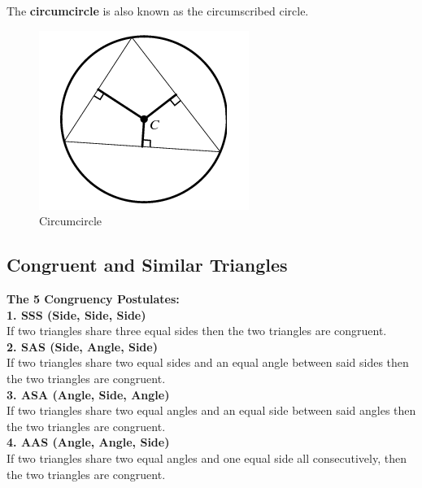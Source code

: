 \documentclass{article}
\begin{document}
            \noindent The \textbf{circumcircle} is also known as the circumscribed circle. \\
            \begin{figure} [hbt!]
                \centering
                \includegraphics[scale = 0.75] {Resources/Unit2Triangles/circumcircle.PNG}
                \caption*{Circumcircle}
            \end{figure}

        \subsection{Congruent and Similar Triangles}
            \color{purple} \textbf{The 5 Congruency Postulates:} \color{black} \\

            \noindent \color{purple}\textbf{1. SSS (Side, Side, Side)} \color{black}\\
            \noindent If two triangles share three equal sides then the two triangles are congruent. \\

            \noindent \color{purple}\textbf{2. SAS (Side, Angle, Side)}\color{black} \\
            \noindent If two triangles share two equal sides and an equal angle between said sides
            then the two triangles are congruent. \\

            \noindent \color{purple}\textbf{3. ASA (Angle, Side, Angle)}\color{black} \\
            \noindent If two triangles share two equal angles and an equal side between said angles
            then the two triangles are congruent. \\

            \noindent \color{purple}\textbf{4. AAS (Angle, Angle, Side)}\color{black} \\
            \noindent If two triangles share two equal angles and one equal side all consecutively,
            then the two triangles are congruent. \\
\end{document}
